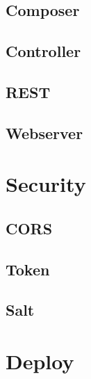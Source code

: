 \subsection{Composer}

\subsection{Controller}

\subsection{REST}

\subsection{Webserver}


\section{Security}

\subsection{CORS}

\subsection{Token}

\subsection{Salt}


\section{Deploy}
